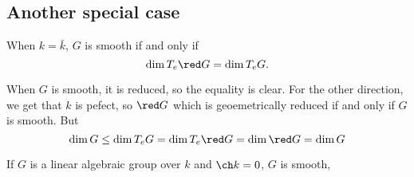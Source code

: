 \documentclass[12pt]{article}
\begin{document}
\subsection{Another special case}
\begin{thm}
	When $k=\bar k$, $G$ is smooth if and only if 
	\[\dim T_e \red G=\dim T_e G.\]
\end{thm}
\begin{rmk}
	When $G$ is smooth, it is reduced, so the equality is clear. For the other direction, we get that $k$ is pefect, so $\red G$
	which is geoemetrically reduced if and only if $G$ is smooth. But 
	\[\dim G\le \dim T_e G=\dim T_e\red G=\dim \red G=\dim G\]
\end{rmk}
\begin{thm}
	If $G$ is a linear algebraic group over $k$ and $\ch k=0$, $G$ is smooth,
\end{thm}
\end{document}
